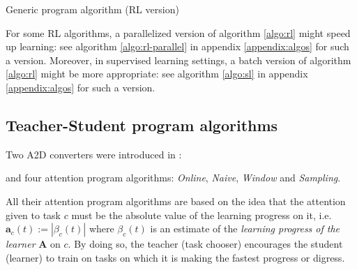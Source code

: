 \documentclass{article}
\DeclareMathOperator*{\argmax}{arg\,max}
\begin{document}
\begin{center}
\begin{algorithm}[H]
\label{algo:rl}
\caption{Generic program algorithm (RL version)}

\end{algorithm}
\end{center}

For some RL algorithms, a parallelized version of algorithm \ref{algo:rl} might speed up learning: see algorithm \ref{algo:rl-parallel} in appendix \ref{appendix:algos} for such a version. Moreover, in supervised learning settings, a batch version of algorithm \ref{algo:rl} might be more appropriate: see algorithm \ref{algo:sl} in appendix \ref{appendix:algos} for such a version.

\subsection{Teacher-Student program algorithms}

Two A2D converters were introduced in \citep{matiisen2017teacher}:
and four attention program algorithms: \textit{Online}, \textit{Naive}, \textit{Window} and \textit{Sampling}.

All their attention program algorithms are based on the idea that the attention given to task $c$ must be the absolute value of the learning progress on it, i.e. \(\textbf{a}_c(t) := |\beta_c(t)|\) where \(\beta_{c}(t)\) is an estimate of the \textit{learning progress of the learner} \(\mathbf{A}\) on \(c\). By doing so, the teacher (task chooser) encourages the student (learner) to train on tasks on which it is making the fastest progress or digress.
\end{document}
